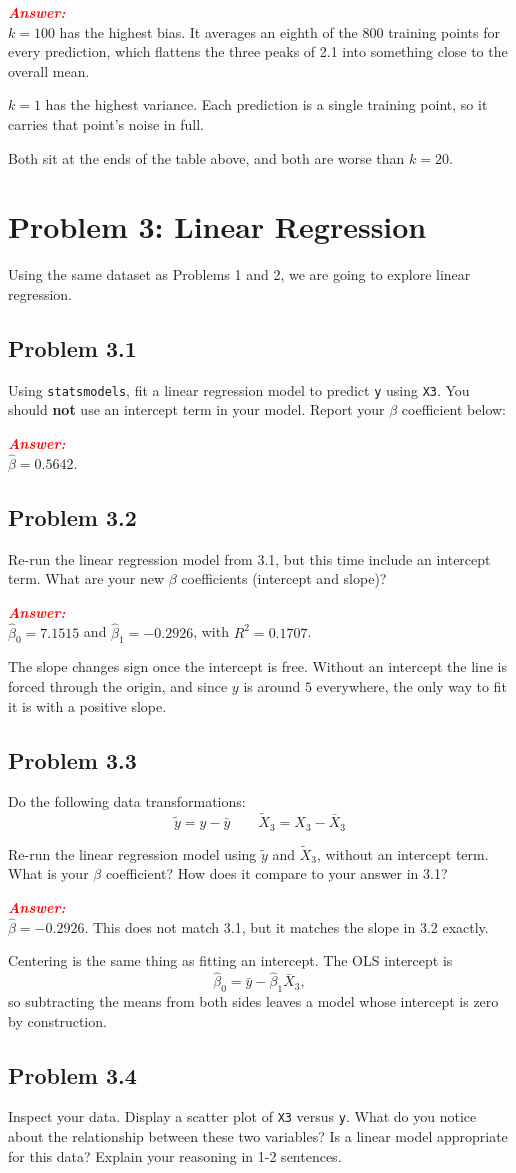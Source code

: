\documentclass[11pt, letterpaper]{article}
\newcommand{\problem}[1]{\section*{Problem #1}}
\newcommand{\subproblem}[1]{\subsection*{Problem #1}}
\newcommand{\answer}{\textbf{\textit{\textcolor{red}{Answer:}}}\\}
\begin{document}
\answer
$k = 100$ has the highest bias. It averages an eighth of the 800 training points for every
prediction, which flattens the three peaks of 2.1 into something close to the overall mean.

$k = 1$ has the highest variance. Each prediction is a single training point, so it carries that
point's noise in full.

Both sit at the ends of the table above, and both are worse than $k = 20$.


\problem{3: Linear Regression}

Using the same dataset as Problems 1 and 2, we are going to explore linear regression.

\subproblem{3.1}

Using \texttt{statsmodels}, fit a linear regression model to predict \texttt{y} using \texttt{X3}.
You should \textbf{not} use an intercept term in your model. Report your
$\beta$ coefficient below:

\answer
$\hat{\beta} = 0.5642$.


\subproblem{3.2}

Re-run the linear regression model from 3.1, but this time include an intercept term.
What are your new $\beta$ coefficients (intercept and slope)?

\answer
$\hat{\beta}_0 = 7.1515$ and $\hat{\beta}_1 = -0.2926$, with $R^2 = 0.1707$.

The slope changes sign once the intercept is free. Without an intercept the line is forced through
the origin, and since $y$ is around $5$ everywhere, the only way to fit it is with a positive slope.


\subproblem{3.3}

Do the following data transformations:
$$\tilde{y} = y - \bar{y} \quad \quad \tilde{X}_3 = X_3 - \bar{X}_3$$

Re-run the linear regression model using $\tilde{y}$ and $\tilde{X}_3$, without an intercept term.
What is your $\beta$ coefficient? How does it compare to your answer in 3.1?

\answer
$\hat{\beta} = -0.2926$. This does not match 3.1, but it matches the slope in 3.2 exactly.

Centering is the same thing as fitting an intercept. The OLS intercept is
$$
\hat{\beta}_0 = \bar{y} - \hat{\beta}_1 \bar{X}_3,
$$
so subtracting the means from both sides leaves a model whose intercept is zero by construction.


\subproblem{3.4}

Inspect your data. Display a scatter plot of \texttt{X3} versus \texttt{y}. What do you notice about the relationship between these two variables?
Is a linear model appropriate for this data? Explain your reasoning in 1-2 sentences.
\end{document}
